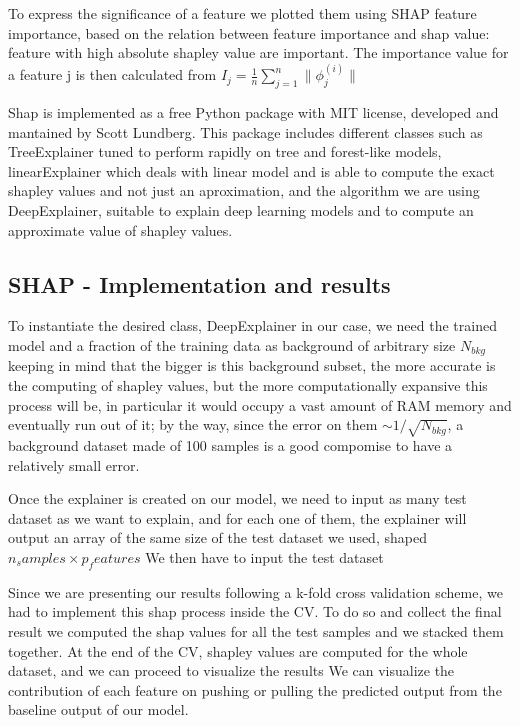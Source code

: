 \documentclass[a4paper,11pt]{article}
\begin{document}
To express the significance of a feature we plotted them using SHAP feature importance, based on the relation between feature importance and shap value: feature with high absolute shapley value are important. The importance value for a feature j is then calculated from $I_j = \frac{1}{n} \sum_{j = 1}^n \|\phi_j^{(i)}\|$


Shap is implemented as a free Python package with MIT license, developed and mantained by Scott Lundberg.
This package includes different classes such as TreeExplainer tuned to perform rapidly on tree and forest-like models, linearExplainer which deals with linear model and is able to compute the exact shapley values and not just an aproximation, and the algorithm we are using DeepExplainer, suitable to explain deep learning models and to compute an approximate value of shapley values.



\subsection{SHAP - Implementation and results}


To instantiate the desired class, DeepExplainer in our case, we need the trained model and a fraction of the training data as background of arbitrary size $N_{bkg}$ keeping in mind that the bigger is this background subset, the more accurate is the computing of shapley values, but the more computationally expansive this process will be, in particular it would occupy a vast amount of RAM memory and eventually run out of it; by the way, since the error on them $\sim 1/\sqrt{N_{bkg}}$, a background dataset made of 100 samples is a good compomise to have a relatively small error.


Once the explainer is created on our model, we need to input as many test dataset as we want to explain, and for each one of them, the explainer will output an array of the same size of the test dataset we used, shaped $n_samples \times p_features$
We then have to input the test dataset


Since we are presenting our results following a k-fold cross validation scheme, we had to implement this shap process inside the CV.
To do so and collect the final result we computed the shap values for all the test samples and we stacked them together.
At the end of the CV, shapley values are computed for the whole dataset, and we can proceed to visualize the results
We can visualize the contribution of each feature on pushing or pulling the predicted output from the baseline output of our model.
\end{document}
